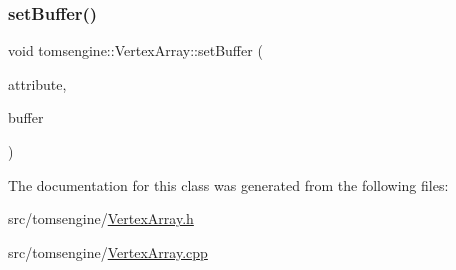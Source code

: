 \mbox{\label{classtomsengine_1_1_vertex_array_a874821cb99cd06bd58eb9a3e552c54aa}} 
\subsubsection{\texorpdfstring{set\+Buffer()}{setBuffer()}}
{\footnotesize\ttfamily void tomsengine\+::\+Vertex\+Array\+::set\+Buffer (\begin{DoxyParamCaption}\item[{std\+::string}]{attribute,  }\item[{\mbox{\hyperlink{classtomsengine_1_1_vertex_buffer}{Vertex\+Buffer}} $\ast$}]{buffer }\end{DoxyParamCaption})}



The documentation for this class was generated from the following files\+:\begin{DoxyCompactItemize}
\item 
src/tomsengine/\mbox{\hyperlink{_vertex_array_8h}{Vertex\+Array.\+h}}\item 
src/tomsengine/\mbox{\hyperlink{_vertex_array_8cpp}{Vertex\+Array.\+cpp}}\end{DoxyCompactItemize}
